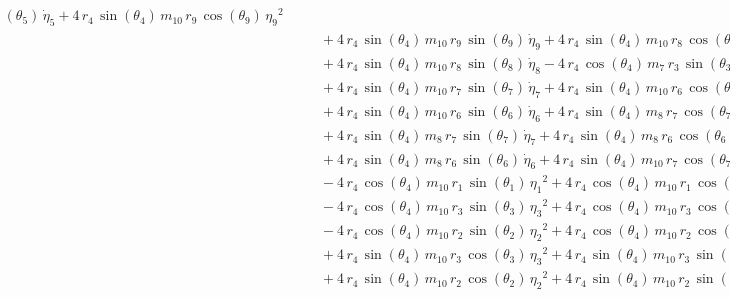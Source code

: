 \begin{eqnarray*}
({\theta_{5}})\,{\dot{\eta}_{5}} + 4\,r_{4}\,\sin({\theta_{4}})\,m_{10
}\,r_{9}\,\cos({\theta_{9}})\,{{\eta_{9}}}^2 \\ &&\quad\mbox{} + 4\,r
_{4}\,\sin({\theta_{4}})\,m_{10}\,r_{9}\,\sin({\theta_{9}})\,{
\dot{\eta}_{9}} + 4\,r_{4}\,\sin({\theta_{4}})\,m_{10}\,r_{8}\,\cos({
\theta_{8}})\,{{\eta_{8}}}^2 \\ &&\quad\mbox{} + 4\,r_{4}\,\sin({
\theta_{4}})\,m_{10}\,r_{8}\,\sin({\theta_{8}})\,{\dot{\eta}_{8}} - 4
\,r_{4}\,\cos({\theta_{4}})\,m_{7}\,r_{3}\,\sin({\theta_{3}})\,{{\eta
_{3}}}^2 \\ &&\quad\mbox{} + 4\,r_{4}\,\sin({\theta_{4}})\,m_{10}\,r_{
7}\,\sin({\theta_{7}})\,{\dot{\eta}_{7}} + 4\,r_{4}\,\sin({\theta_{4}}
)\,m_{10}\,r_{6}\,\cos({\theta_{6}})\,{{\eta_{6}}}^2 \\ &&\quad\mbox{}
 + 4\,r_{4}\,\sin({\theta_{4}})\,m_{10}\,r_{6}\,\sin({\theta_{6}})\,{
\dot{\eta}_{6}} + 4\,r_{4}\,\sin({\theta_{4}})\,m_{8}\,r_{7}\,\cos({
\theta_{7}})\,{{\eta_{7}}}^2 \\ &&\quad\mbox{} + 4\,r_{4}\,\sin({
\theta_{4}})\,m_{8}\,r_{7}\,\sin({\theta_{7}})\,{\dot{\eta}_{7}} + 4\,
r_{4}\,\sin({\theta_{4}})\,m_{8}\,r_{6}\,\cos({\theta_{6}})\,{{\eta_{6
}}}^2 \\ &&\quad\mbox{} + 4\,r_{4}\,\sin({\theta_{4}})\,m_{8}\,r_{6}\,
\sin({\theta_{6}})\,{\dot{\eta}_{6}} + 4\,r_{4}\,\sin({\theta_{4}})\,m
_{10}\,r_{7}\,\cos({\theta_{7}})\,{{\eta_{7}}}^2 \\ &&\quad\mbox{} - 4
\,r_{4}\,\cos({\theta_{4}})\,m_{10}\,r_{1}\,\sin({\theta_{1}})\,{{\eta
_{1}}}^2 + 4\,r_{4}\,\cos({\theta_{4}})\,m_{10}\,r_{1}\,\cos({\theta_{
1}})\,{\dot{\eta}_{1}} \\ &&\quad\mbox{} - 4\,r_{4}\,\cos({\theta_{4}}
)\,m_{10}\,r_{3}\,\sin({\theta_{3}})\,{{\eta_{3}}}^2 + 4\,r_{4}\,\cos(
{\theta_{4}})\,m_{10}\,r_{3}\,\cos({\theta_{3}})\,{\dot{\eta}_{3}}
 \\ &&\quad\mbox{} - 4\,r_{4}\,\cos({\theta_{4}})\,m_{10}\,r_{2}\,\sin
({\theta_{2}})\,{{\eta_{2}}}^2 + 4\,r_{4}\,\cos({\theta_{4}})\,m_{10}
\,r_{2}\,\cos({\theta_{2}})\,{\dot{\eta}_{2}} \\ &&\quad\mbox{} + 4\,r
_{4}\,\sin({\theta_{4}})\,m_{10}\,r_{3}\,\cos({\theta_{3}})\,{{\eta_{3
}}}^2 + 4\,r_{4}\,\sin({\theta_{4}})\,m_{10}\,r_{3}\,\sin({\theta_{3}}
)\,{\dot{\eta}_{3}} \\ &&\quad\mbox{} + 4\,r_{4}\,\sin({\theta_{4}})\,
m_{10}\,r_{2}\,\cos({\theta_{2}})\,{{\eta_{2}}}^2 + 4\,r_{4}\,\sin({
\theta_{4}})\,m_{10}\,r_{2}\,\sin({\theta_{2}})\,{\dot{\eta}_{2}}

\end{eqnarray*}
